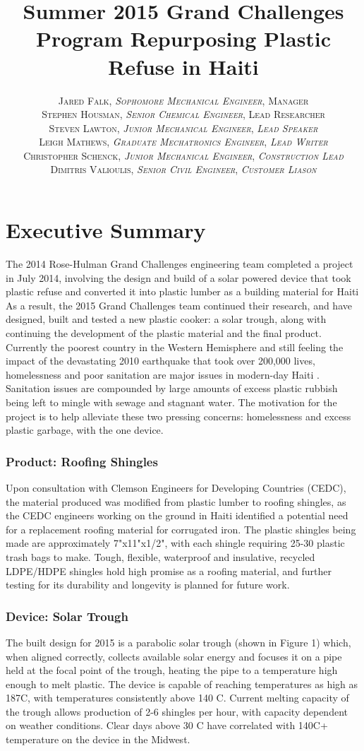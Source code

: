 \documentclass[paper=letter, fontsize=12pt]{article}
\title{\vspace{-15mm}\fontsize{16pt}{10pt}\selectfont\textbf{Summer 2015 Grand Challenges Program 
\fontsize{26pt}{10pt}\selectfont Repurposing Plastic Refuse in Haiti}} %
\author{
\large
{\textsc{Jared Falk, \textit{Sophomore Mechanical Engineer}, \textnormal{Manager} }}\\[2mm]
{\textsc{Stephen Housman, \textit{Senior Chemical Engineer}, \textnormal{Lead Researcher} }}\\[2mm]
{\textsc{Steven Lawton, \textit{Junior Mechanical Engineer}, \textit{Lead Speaker} }}\\[2mm]
{\textsc{Leigh Mathews, \textit{Graduate Mechatronics Engineer}, \textit{Lead Writer} }}\\[2mm]
{\textsc{Christopher Schenck, \textit{Junior Mechanical Engineer}, \textit{Construction Lead} }}\\[2mm]
{\textsc{Dimitris Valioulis, \textit{Senior Civil Engineer}, \textit{Customer Liason} }}\\[2mm]
}
\date{}
\begin{document}
\maketitle %
\thispagestyle{fancy} %

\section*{Executive Summary}
The 2014 Rose-Hulman Grand Challenges engineering team completed a project in July 2014, involving the design and build of a solar powered device that took plastic refuse and converted it into plastic lumber as a building material for Haiti \cite{piens2015engineering} As a result, the 2015 Grand Challenges team continued their research, and have designed, built and tested a new plastic cooker: a solar trough, along with continuing the development of the plastic material and the final product. \\

\noindent Currently the poorest country in the Western Hemisphere and still feeling the impact of the devastating 2010 earthquake that took over 200,000 lives, homelessness and poor sanitation are major issues in modern-day Haiti \cite{income}. Sanitation issues are compounded by large amounts of excess plastic rubbish being left to mingle with sewage and stagnant water. The motivation for the project is to help alleviate these two pressing concerns: homelessness and excess plastic garbage, with the one device. 

\subsubsection*{Product: Roofing Shingles}
Upon consultation with Clemson Engineers for Developing Countries (CEDC), the material produced was modified from plastic lumber to roofing shingles, as the CEDC engineers working on the ground in Haiti identified a potential need for a replacement roofing material for corrugated iron. The plastic shingles being made are approximately 7"x11"x1/2", with each shingle requiring 25-30 plastic trash bags to make. Tough, flexible, waterproof and insulative, recycled LDPE/HDPE shingles  hold high promise as a roofing material, and further testing for its durability and longevity is planned for future work. 

\subsubsection*{Device: Solar Trough}
The built design for 2015 is a parabolic solar trough (shown in Figure 1) which, when aligned correctly, collects  available solar energy and focuses it on a pipe held at the focal point of the trough, heating the pipe to a temperature high enough to melt plastic. The device is capable of reaching temperatures as high as 187\degree C, with temperatures consistently above 140 \degree C. Current melting capacity of the trough allows production of 2-6 shingles per hour, with capacity dependent on weather conditions. Clear days above 30 \degree C have correlated with 140\degree C+ temperature on the device in the Midwest.
\end{document}
